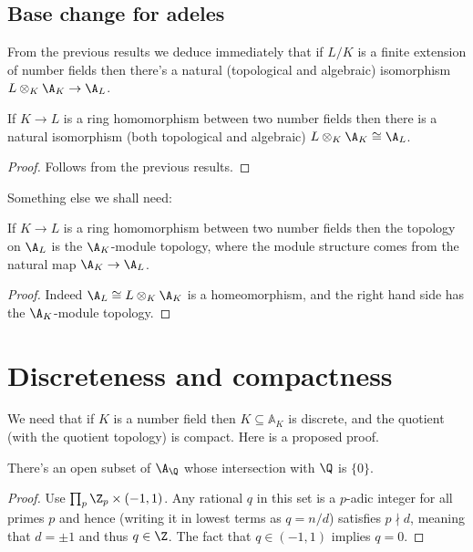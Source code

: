 \subsection{Base change for adeles}

From the previous results we deduce immediately that if $L/K$ is a finite extension
of number fields then there's a natural (topological and algebraic) isomorphism
$L\otimes_K\A_K\to \A_L$.

\begin{theorem}
  \label{NumberField.AdeleRing.baseChangeEquiv}
  If $K\to L$ is a ring homomorphism between two number fields then there is a natural isomorphism
  (both topological and algebraic) $L\otimes_K\A_K\cong\A_L$.
\end{theorem}
\begin{proof}
  Follows from the previous results.
\end{proof}

Something else we shall need:

\begin{theorem}
  \label{NumberField.AdeleRing.baseChange_moduleTopology}
  If $K\to L$ is a ring homomorphism between two number fields then the topology on $\A_L$
  is the $\A_K$-module topology, where the module structure comes from the
  natural map $\A_K\to\A_L$.
\end{theorem}
\begin{proof}
  Indeed $\A_L\cong L\otimes_K\A_K$ is a homeomorphism, and
  the right hand side has the $\A_K$-module topology.
\end{proof}

\section{Discreteness and compactness}

We need that if $K$ is a number field then
$K\subseteq\mathbb{A}_K$ is discrete, and the quotient (with the
quotient topology) is compact. Here is a proposed proof.

\begin{theorem}
  \label{Rat.AdeleRing.zero_discrete}
  \leanok
  There's an open subset of $\A_{\Q}$ whose intersection with $\Q$ is $\{0\}$.
\end{theorem}
\begin{proof}
  Use $\prod_p{\Z_p}\times(-1,1)$. Any rational $q$ in this set is a $p$-adic
  integer for all primes $p$ and hence (writing it in lowest terms as $q=n/d$)
  satisfies $p\nmid d$, meaning that $d=\pm1$ and thus $q\in\Z$. The fact
  that $q\in(-1,1)$ implies $q=0$.
\end{proof}

